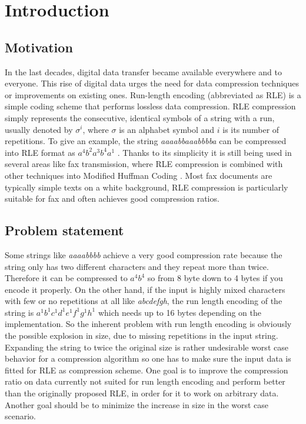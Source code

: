 
\chapter{Introduction}
\label{ch:Introduction}
\section{Motivation}
\label{ch:Introduction:sec:Motivation}
\par{
In the last decades, digital data transfer became available everywhere and to everyone. This rise of digital data urges the need for data compression techniques or improvements on existing ones. Run-length encoding \cite{rle-patent} (abbreviated as RLE) is a simple coding scheme that performs lossless data compression. RLE compression simply represents the consecutive, identical symbols of a string with a run, usually denoted by $\sigma^i$, where $\sigma$ is an alphabet symbol and $i$ is its number of repetitions. To give an example, the string \emph{aaaabbaaabbbba} can be compressed into RLE format as  $ a^{4}b^{2}a^{3}b^{4}a^{1}$ . Thanks to its simplicity it is still being used in several areas like fax transmission, where RLE compression is combined with other techniques into Modified Huffman Coding \cite{fax-rle}. Most fax documents are typically simple texts on a white background, RLE compression is particularly suitable for fax and often achieves good compression ratios.
}
\section{Problem statement}
\label{ch:Introduction:sec:Problem statement}
\par{
Some strings like \emph{aaaabbbb} achieve a very good compression rate because the string only has two different characters and they repeat more than twice. Therefore it can be compressed to $a^4b^4$ so from 8 byte down to 4 bytes if you encode it properly. On the other hand, if the input is highly mixed characters with few or no repetitions at all like \emph{abcdefgh}, the run length encoding of the string is $a^1b^1c^1d^1e^1f^1g^1h^1$ which needs up to 16 bytes depending on the implementation. So the inherent problem with run length encoding is obviously the possible explosion in size, due to missing repetitions in the input string. Expanding the string to twice the original size is rather undesirable worst case behavior for a compression algorithm so one has to make sure the input data is fitted for RLE as compression scheme. One goal is to improve the compression ratio on data currently not suited for run length encoding and perform better than the originally proposed RLE, in order for it to work on arbitrary data. Another goal should be to minimize the increase in size in the worst case scenario.}

